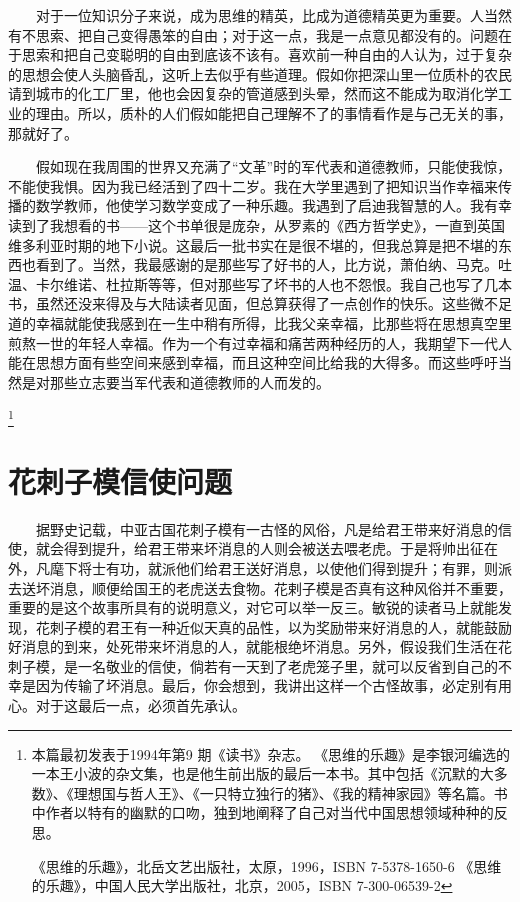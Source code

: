 　　对于一位知识分子来说，成为思维的精英，比成为道德精英更为重要。人当然有不思索、把自己变得愚笨的自由；对于这一点，我是一点意见都没有的。问题在于思索和把自己变聪明的自由到底该不该有。喜欢前一种自由的人认为，过于复杂的思想会使人头脑昏乱，这听上去似乎有些道理。假如你把深山里一位质朴的农民请到城市的化工厂里，他也会因复杂的管道感到头晕，然而这不能成为取消化学工业的理由。所以，质朴的人们假如能把自己理解不了的事情看作是与己无关的事，那就好了。 

　　假如现在我周围的世界又充满了“文革”时的军代表和道德教师，只能使我惊，不能使我惧。因为我已经活到了四十二岁。我在大学里遇到了把知识当作幸福来传播的数学教师，他使学习数学变成了一种乐趣。我遇到了启迪我智慧的人。我有幸读到了我想看的书——这个书单很是庞杂，从罗素的《西方哲学史》，一直到英国维多利亚时期的地下小说。这最后一批书实在是很不堪的，但我总算是把不堪的东西也看到了。当然，我最感谢的是那些写了好书的人，比方说，萧伯纳、马克。吐温、卡尔维诺、杜拉斯等等，但对那些写了坏书的人也不怨恨。我自己也写了几本书，虽然还没来得及与大陆读者见面，但总算获得了一点创作的快乐。这些微不足道的幸福就能使我感到在一生中稍有所得，比我父亲幸福，比那些将在思想真空里煎熬一世的年轻人幸福。作为一个有过幸福和痛苦两种经历的人，我期望下一代人能在思想方面有些空间来感到幸福，而且这种空间比给我的大得多。而这些呼吁当然是对那些立志要当军代表和道德教师的人而发的。

\footnote{本篇最初发表于1994年第9 期《读书》杂志。
《思维的乐趣》是李银河编选的一本王小波的杂文集，也是他生前出版的最后一本书。其中包括《沉默的大多数》、《理想国与哲人王》、《一只特立独行的猪》、《我的精神家园》等名篇。书中作者以特有的幽默的口吻，独到地阐释了自己对当代中国思想领域种种的反思。 

《思维的乐趣》，北岳文艺出版社，太原，1996，ISBN 7-5378-1650-6 
《思维的乐趣》，中国人民大学出版社，北京，2005，ISBN 7-300-06539-2
}

\chapter{花刺子模信使问题}

　　据野史记载，中亚古国花刺子模有一古怪的风俗，凡是给君王带来好消息的信使，就会得到提升，给君王带来坏消息的人则会被送去喂老虎。于是将帅出征在外，凡麾下将士有功，就派他们给君王送好消息，以使他们得到提升；有罪，则派去送坏消息，顺便给国王的老虎送去食物。花剌子模是否真有这种风俗并不重要，重要的是这个故事所具有的说明意义，对它可以举一反三。敏锐的读者马上就能发现，花刺子模的君王有一种近似天真的品性，以为奖励带来好消息的人，就能鼓励好消息的到来，处死带来坏消息的人，就能根绝坏消息。另外，假设我们生活在花刺子模，是一名敬业的信使，倘若有一天到了老虎笼子里，就可以反省到自己的不幸是因为传输了坏消息。最后，你会想到，我讲出这样一个古怪故事，必定别有用心。对于这最后一点，必须首先承认。 

